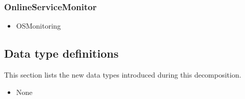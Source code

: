     \subsubsection{OnlineServiceMonitor}
        \begin{itemize}
            \item OSMonitoring
        \end{itemize}

\subsection{Data type definitions}
    This section lists the new data types introduced during this decomposition.

    \begin{itemize}
        \item None
    \end{itemize}
